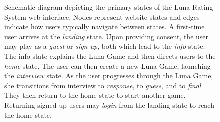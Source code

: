 \begin{figure}
\caption{Schematic diagram depicting the primary states of the Luna Rating System web interface. Nodes represent website states and edges indicate how users typically navigate between states. A first-time user arrives at the \textit{landing} state. Upon providing consent, the user may play as a \textit{guest} or \textit{sign up}, both which lead to the \textit{info} state. The info state explains the Luna Game and then directs users to the \textit{home} state. The user can then create a new Luna Game, launching the \textit{interview} state. As the user progresses through the Luna Game, she transitions from interview to \textit{response}, to \textit{guess}, and to \textit{final}. They then return to the home state to start another game. Returning signed up users may \textit{login} from the landing state to reach the home state.}
\label{statediagram}
\end{figure}

